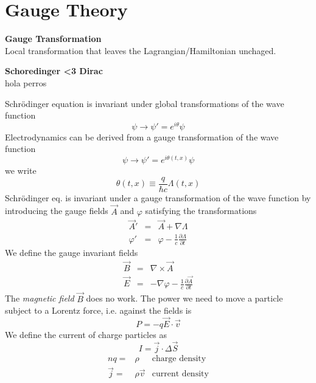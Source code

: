 \documentclass[12pt,a4paper]{article}
\author{José Antonio}
\begin{document}
\section{Gauge Theory}
\textbf{Gauge Transformation}\\
Local transformation that leaves the Lagrangian/Hamiltonian unchaged.

\textbf{Schoredinger <3 Dirac }\\

hola perros

Schrödinger equation is invariant under global transformations of the wave function
\begin{equation}
	\psi \rightarrow \psi'=e^{i\theta}\psi
\end{equation} 
Electrodynamics can be derived from a gauge transformation of the wave function
\begin{equation}
	\psi \rightarrow \psi'=e^{i\theta(t,x)}\psi
\end{equation} 
we write
\begin{equation}
	\theta(t,x) \equiv \frac{q}{\hbar c}\Lambda(t,x)
\end{equation}
Schrödinger eq. is invariant under a gauge transformation of the wave function by introducing the gauge fields $\vec{A}$ and $\varphi$ satisfying the transformations
\begin{eqnarray}
	\vec{A}' & = & \vec{A} + \nabla \Lambda \\
	\varphi' & = & \varphi - \frac{1}{c}\frac{\partial \Lambda}{\partial t}
\end{eqnarray}
We define the gauge invariant fields
\begin{eqnarray}
	\vec{B} & = & \nabla \times \vec{A} \\
	\vec{E} & = & - \nabla \varphi  - \frac{1}{c}\frac{\partial \vec{A}}{\partial t}
\end{eqnarray}
The \textit{magnetic field} $\vec{B}$ does no work. The power we need to move a particle subject to a Lorentz force, i.e. against the fields is
\begin{equation}
	P = -q\vec{E}\cdot \vec{v}
\end{equation}
We define the current of charge particles as
\begin{equation}
	I = \vec{j}\cdot \Delta \vec{S}
\end{equation}
\begin{eqnarray}
	 nq  = & \rho &  \text{charge density}\\\vec{j}  = & \rho \vec{v}  &  \text{current density}
\end{eqnarray}
\end{document}
